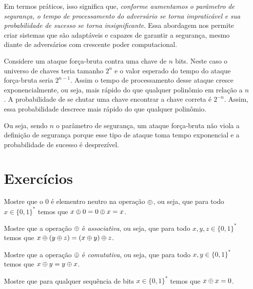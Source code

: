 Em termos práticos, isso significa que, {\em conforme aumentamos o parâmetro de segurança, o tempo de processamento do adversário se torna impraticável e sua probabilidade de sucesso se torna insignificante}.
Essa abordagem nos permite criar sistemas que são adaptáveis e capazes de garantir a segurança, mesmo diante de adversários com crescente poder computacional.

\begin{example}
  Considere um ataque força-bruta contra uma chave de $n$ bits.
  Neste caso o universo de chaves teria tamanho $2^n$ e o valor esperado do tempo do ataque força-bruta seria $2^{n-1}$.
  Assim o tempo de processamento desse ataque cresce exponencialmente, ou seja, mais rápido do que qualquer polinômio em relação a $n$.
  A probabilidade de se chutar uma chave encontrar a chave correta é $2^{-n}$.
  Assim, essa probabilidade descrece mais rápido do que qualquer polinômio.

  Ou seja, sendo $n$ o parâmetro de segurança, um ataque força-bruta não viola a definição de segurança porque esse tipo de ataque toma tempo exponencial e a probabilidade de sucesso é desprezível.
\end{example}


\section{Exercícios}
\label{sec:exercicios}

\begin{exercicio}
  Mostre que o $0$ é elementro neutro na operação $\oplus$, ou seja, que para todo $x \in \{0,1\}^*$ temos que $x \oplus 0 = 0 \oplus x = x$.
\end{exercicio}

\begin{exercicio}
  Mostre que a operação $\oplus$ é {\em associativa}, ou seja, que para todo $x,y,z \in \{0,1\}^*$ temos que $x \oplus (y \oplus z) = (x \oplus y) \oplus z$.
\end{exercicio}

\begin{exercicio}
  Mostre que a operação $\oplus$ é {\em comutativa}, ou seja, que para todo $x,y \in \{0,1\}^*$ temos que $x \oplus y = y \oplus x$.
\end{exercicio}

\begin{exercicio}
  Mostre que para qualquer sequência de bits $x \in \{0,1\}^*$ temos que $x \oplus x = 0$.
\end{exercicio}

